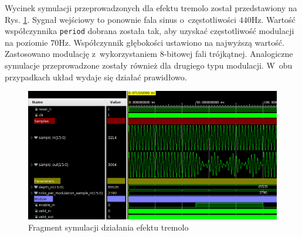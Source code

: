 Wycinek symulacji przeprowadzonych dla efektu tremolo został przedstawiony na Rys. \ref{sim-tremolo}. Sygnał wejściowy to ponownie fala sinus o~częstotliwości $440$Hz. Wartość współczynnika \verb|period| dobrana została tak, aby uzyskać częstotliwość modulacji na poziomie $70$Hz. Współczynnik głębokości ustawiono na najwyższą wartość. Zastosowano modulację z~wykorzystaniem 8-bitowej fali trójkątnej. Analogiczne symulacje przeprowadzone zostały również dla drugiego typu modulacji. W~obu przypadkach układ wydaje się działać prawidłowo. 

\vspace{0.5cm}
\begin{figure}[ht]
    \centering
    \includegraphics[width=\textwidth]{img/sim/tremolo_sim.png}
    \captionsetup{format=plain,justification=centering}
    \caption{Fragment symulacji działania efektu tremolo}
    \label{sim-tremolo}
\end{figure}
\vspace{0.5cm}